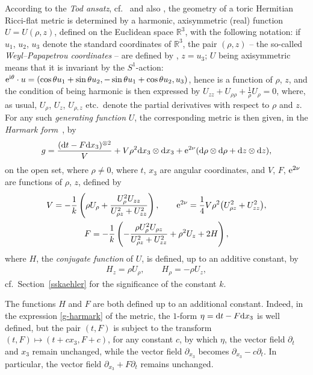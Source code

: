 \documentclass[10pt,a4paper]{amsart}
\numberwithin{equation}{section}
\begin{document}
According to the {\it Tod ansatz}, cf.\ \cite{T} and also \cite[Section~3]{BG}, the geometry of a toric Hermitian Ricci-flat metric is determined by a harmonic, axisymmetric (real) function $U = U(\rho, z)$, defined on the Euclidean space $\mathbb{R} ^3$, with the following notation: if $u_1$, $u_2$, $u_3$ denote the standard coordinates of $\mathbb{R} ^3$, the pair $(\rho, z)$ -- the so-called {\it Weyl--Papapetrou coordinates} -- are defined by , $z = u _3$; $U$ being axisymmetric means that it is invariant by the $S^1$-action: ${\rm e}^{{\rm i} \theta} \cdot u = (\cos{\theta} u_1 + \sin{\theta} u_2, - \sin{\theta} u_1 + \cos{\theta} u_2, u_3)$, hence is a function of $\rho$, $z$, and the condition of being harmonic is then expressed by $U_{z z} + U_{\rho \rho} + \frac{1}{\rho} U_{\rho} = 0$, where, as usual, $U_{\rho}$, $U_z$, $U _{\rho, z}$ etc.\ denote the partial derivatives with respect to $\rho$ and $z$.
For any such {\it generating function} $U$, the corresponding metric is then given, in the {\it Harmark form}~\cite{CT1,harmark}, by
\begin{gather} \label{g-harmark} g = \frac{({\rm d}t - F {\rm d} x _3) ^{\otimes 2}}{V} + V \rho ^2 {\rm d} x _3 \otimes {\rm d} x _3 + {\rm e}^{2 \nu} ({\rm d} \rho \otimes {\rm d} \rho + {\rm d} z \otimes {\rm d} z), \end{gather}
on the open set, where $\rho \neq 0$,
where $t$, $x_3$ are angular coordinates, and $V$, $F$, ${\rm e}^{2 \nu}$ are functions of $\rho$, $z$, defined by
\begin{gather} V = - \frac{1}{k} \left(\rho U_{\rho} + \frac{U_{\rho} ^2 U_{z z}}{U_{\rho z} ^2 + U _{z z} ^2}\right), \qquad {\rm e}^{2 \nu} = \frac{1}{4} V \rho ^2 \big(U_{\rho z} ^2 + U_{z z} ^2\big), \label{V-nu}\\
F = - \frac{1}{k} \left(- \frac{\rho U_{\rho} ^2 U_{\rho z}}{U_{\rho z}^2 + U_{z z} ^2} + \rho ^2 U_z + 2 H\right), \label{F} \end{gather}
where $H$, the {\it conjugate function} of $U$, is defined, up to an additive constant, by
\begin{gather} \label{H} H _z = \rho U _{\rho}, \qquad H _{\rho} = - \rho U_z, \end{gather}
cf.\ Section~\ref{sskaehler} for the significance of the constant $k$.


The functions $H$ and $F$ are both defined up to an additional constant. Indeed, in the expression \eqref{g-harmark} of the metric, the $1$-form $\eta = {\rm d}t - F {\rm d} x _3$ is well defined, but the pair $(t, F)$ is subject to the transform $(t, F) \mapsto (t + c x_3, F + c)$, for any constant $c$, by which $\eta$, the vector field $\partial _t$ and $x _3$ remain unchanged, while the vector field $\partial _{x_3}$ becomes $\partial _{x _3} - c \partial _t$. In particular, the vector field $\partial _{x_3} + F \partial _t$ remains unchanged.
\end{document}

